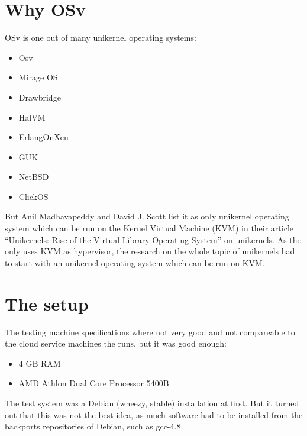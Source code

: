 
\chapter{Why OSv}

    OSv is one out of many unikernel operating systems:

        \begin{itemize}
            \item Osv
            \item Mirage OS
            \item Drawbridge
            \item HalVM
            \item ErlangOnXen
            \item GUK
            \item NetBSD
            \item ClickOS
        \end{itemize}\cite[S. 13]{unikernels}

    But Anil Madhavapeddy and David J. Scott list it as only unikernel operating
    system which can be run on the Kernel Virtual Machine (KVM) in their article
    ``Unikernels: Rise of the Virtual Library Operating System'' on unikernels.
    As the \HFU only uses KVM as
    hypervisor, the research on the whole topic of unikernels had to start with
    an unikernel operating system which can be run on KVM.

\chapter{The setup}

    The testing machine specifications where not very good and not compareable
    to the cloud service machines the \HFU runs, but it was good enough:

        \begin{itemize}
            \item 4 GB RAM
            \item AMD Athlon Dual Core Processor 5400B
        \end{itemize}

    The test system was a Debian (wheezy, stable) installation at first. But it
    turned out that this was not the best idea, as much software had to be
    installed from the backports repositories of Debian, such as gcc-4.8.

